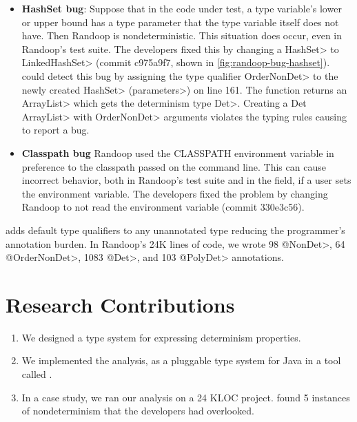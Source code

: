\begin{itemize}
    \item
    \textbf{HashSet bug}: Suppose that in the code under test, a type variable's lower or upper
    bound has a type parameter that the type variable itself does not have. Then Randoop is nondeterministic.
    This situation does occur, even in Randoop's test suite.
    The developers fixed this by changing a \<HashSet> to \<LinkedHashSet>
    (commit c975a9f7, shown in \cref{fig:randoop-bug-hashset}). 
    \TheDeterminismChecker could detect this bug by assigning the type qualifier \<OrderNonDet>
    to the newly created \<HashSet> (\<parameters>) on line 161. The function returns an \<ArrayList> which gets the determinism type \<Det>. Creating a \<Det ArrayList> with 
    \<OrderNonDet> arguments violates the typing rules causing \theDeterminismChecker to report a bug.
    
    \item
    \textbf{Classpath bug}
    Randoop used the CLASSPATH environment variable in preference to the
    classpath passed on the command line.
    This can cause incorrect behavior, both in Randoop's test suite and in the field,
    if a user sets the environment variable.
    The developers fixed the problem by changing Randoop to not read the environment variable
    (commit 330e3c56).
\end{itemize}

\TheDeterminismChecker adds default type qualifiers to any unannotated type reducing the programmer's annotation burden.
In Randoop's 24K lines of code, we wrote
98 \<@NonDet>,
64 \<@OrderNonDet>,
1083 \<@Det>,
and 103 \<@PolyDet> annotations.

\section{Research Contributions\label{sec:contributions}}
\begin{enumerate}
  \item We designed a type system for expressing determinism properties.

  \item We implemented the analysis, as a pluggable type system for Java in a
    tool called \theDeterminismChecker.

  \item In a case study, we ran our analysis on a 24 KLOC project.
    \TheDeterminismChecker
    found 5 instances of nondeterminism that the developers had
    overlooked.
\end{enumerate}

